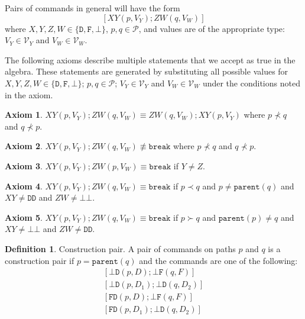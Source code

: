 \documentclass[12pt]{article}
\newcommand{\setvx}[1]{\mathcal{V}_{#1}}
\newcommand{\setp}{\mathcal{P}}
\newcommand{\empt}{\bot}
\newcommand{\parent}{\mathtt{parent}}
\newcommand{\cbrk}{\mathtt{break}}
\newcommand{\fscommand}[2]{{#1#2}}
\newcommand{\fsregcommandchar}[1]{\mathtt{#1}}
\newcommand{\fsregcommand}[2]{\fscommand{\fsregcommandchar{#1}}{\fsregcommandchar{#2}}}
\newcommand{\cbb}{\fsregcommand{\empt}{\empt}}
\newcommand{\cbf}{\fsregcommand{\empt}{F}}
\newcommand{\cbd}{\fsregcommand{\empt}{D}}
\newcommand{\cfd}{\fsregcommand{F}{D}}
\newcommand{\cdd}{\fsregcommand{D}{D}}
\newcommand{\cxy}{\fscommand{X}{Y}}
\newcommand{\czw}{\fscommand{Z}{W}}
\newcommand{\typeset}{\{\fsregcommandchar{D},\fsregcommandchar{F},\empt\}}
\newcommand{\descendant}{\prec}
\newcommand{\ancestor}{\succ}
\newcommand{\nequiv}{\not\equiv}
\theoremstyle{definition}
\newtheorem{mydef}{Definition}
\newtheorem{myax}{Axiom}
\begin{document}
Pairs of commands in general will have the form
\[ [\cxy(p,V_Y); \czw(q,V_W)] \]
where $X,Y,Z,W\in\typeset$, $p,q\in\setp$, 
and values are of the appropriate type: 
$V_Y\in\setvx{Y}$ and $V_W\in\setvx{W}$.

The following axioms describe multiple statements
that we accept as true in the algebra.
These statements are generated by substituting 
all possible values for
$X,Y,Z,W\in\typeset$; $p,q\in\setp$; $V_Y\in\setvx{Y}$ and $V_W\in\setvx{W}$
under the conditions noted in the axiom.


\begin{myax}\label{ax_separate_commute}
$\cxy(p,V_Y); \czw(q,V_W) \equiv \czw(q,V_W); \cxy(p,V_Y)$ where $p\not\descendant q$ and $q\not\descendant p$.
\end{myax}

\begin{myax}\label{ax_separate_nobreaks}
$\cxy(p,V_Y); \czw(q,V_W) \nequiv \cbrk$ where $p\not\descendant q$ and $q\not\descendant p$.
\end{myax}

\begin{myax}\label{ax_same_breaks}
$\cxy(p,V_Y); \czw(p,V_W) \equiv \cbrk$ if $Y\ne Z$.
\end{myax}

\begin{myax}\label{ax_distantchild_breaks}
$\cxy(p,V_Y); \czw(q,V_W) \equiv \cbrk$ if $p\descendant q$ and $p\neq\parent(q)$ and $\cxy\neq\cdd$ and $\czw\neq\cbb$.
\end{myax}

\begin{myax}\label{ax_distantparent_breaks}
$\cxy(p,V_Y); \czw(q,V_W) \equiv \cbrk$ if $p\ancestor q$ and $\parent(p)\neq q$ and $\cxy\neq\cbb$ and $\czw\neq\cdd$.
\end{myax}

\begin{mydef}{Construction pair.}
A pair of commands on paths $p$ and $q$ is a construction pair if $p=\parent(q)$ and the commands are one
of the following:
   \begin{gather*}
            [\cbd(p, D); \cbf(q, F)] \\
            [\cbd(p, D_1); \cbd(q, D_2)] \\
            [\cfd(p, D); \cbf(q, F)] \\
            [\cfd(p, D_1); \cbd(q, D_2)]
   \end{gather*}
\end{mydef}
\end{document}
